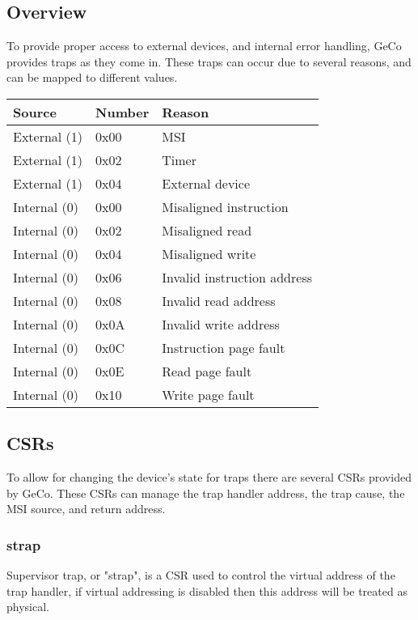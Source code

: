 \documentclass[6pt]{article}
\begin{document}
\subsection{Overview}
To provide proper access to external devices, and internal error handling, GeCo provides traps as they come in. These traps can occur due to several reasons, and can be mapped to different values.
\begin{center}
\begin{tabularx}{\textwidth}{ |>{\raggedright\arraybackslash}X|>{\raggedright\arraybackslash}X|>{\raggedright\arraybackslash}X| }
    \hline
    Source & Number & Reason \\
    \hline
    External (1) & 0x00 & MSI \\
    External (1) & 0x02 & Timer \\
    External (1) & 0x04 & External device \\
    \hline
    Internal (0) & 0x00 & Misaligned instruction \\
    Internal (0) & 0x02 & Misaligned read \\
    Internal (0) & 0x04 & Misaligned write \\
    Internal (0) & 0x06 & Invalid instruction address \\
    Internal (0) & 0x08 & Invalid read address \\
    Internal (0) & 0x0A & Invalid write address \\
    Internal (0) & 0x0C & Instruction page fault \\
    Internal (0) & 0x0E & Read page fault \\
    Internal (0) & 0x10 & Write page fault \\
    \hline
\end{tabularx}
\end{center}

\subsection{CSRs}
To allow for changing the device's state for traps there are several CSRs provided by GeCo. These CSRs can manage the trap handler address, the trap cause, the MSI source, and return address.

\subsubsection{strap}
Supervisor trap, or "strap", is a CSR used to control the virtual address of the trap handler, if virtual addressing is disabled then this address will be treated as physical.
\end{document}

